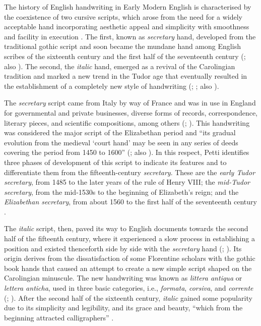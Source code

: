 \documentclass{article}
\begin{document}
The history of English handwriting in Early Modern English is
characterised by the coexistence of two cursive scripts, which arose from the need for a widely acceptable hand incorporating aesthetic
appeal and simplicity with smoothness and facility in execution \citep[16]{petti_english_1977}. The first, known as \emph{secretary} hand, developed from the
traditional gothic script and soon became the mundane hand among English
scribes of the sixteenth century and the first half of the seventeenth
century (\cite[8]{dawson_elizabethan_1966}; also \cite[16]{petti_english_1977}). The
second, the \emph{italic} hand, emerged as a revival of the
Carolingian tradition and marked a new trend in the Tudor age that
eventually resulted in the establishment of a completely new style of
handwriting (\cite[20]{fairbank_renaissance_1960}; \cite[viii]{preston_english_1999}; also \cite[18]{petti_english_1977}).

The \emph{secretary} script came from Italy by way of
France and was in use in England for governmental and private
businesses, diverse forms of records, correspondence, literary pieces,
and scientific compositions, among others (\cite[8--9]{dawson_elizabethan_1966}; \cite[viii]{preston_english_1999}). This handwriting was
considered the major script of the Elizabethan period and ``its gradual
evolution from the medieval `court hand' may be seen in any series of
deeds covering the period from 1450 to 1600'' (\cite[414]{schulz_teaching_1943}; also
\cite{jenkinson_later_1927}). In this respect, Petti identifies three phases of
development of this script to indicate its features and to differentiate
them from the fifteenth-century \emph{secretary}. These are the
\emph{early Tudor secretary}, from 1485 to the later years of the rule
of Henry VIII; the \emph{mid-Tudor secretary}, from the mid-1530s to the
beginning of Elizabeth's reign; and the \emph{Elizabethan secretary},
from about 1560 to the first half of the seventeenth century \citep[16--18]{petti_english_1977}.

The \emph{italic} script, then, paved its way to English
documents towards the second half of the fifteenth century, where it
experienced a slow process in establishing a position and existed
thenceforth side by side with the \emph{secretary} hand (\cite[28]{fairbank_renaissance_1960}; \cite[viii]{preston_english_1999}). Its origin derives from
the dissatisfaction of some Florentine scholars with the gothic book
hands that caused an attempt to create a new simple script shaped on the
Carolingian minuscule. The new handwriting was known as \emph{littera
antiqua} or \emph{lettera anticha}, used in three basic categories, i.e.,
\emph{formata}, \emph{corsiva}, and \emph{corrente} (\cite[6]{morison_early_1943};
\cite[18]{petti_english_1977}). After the second half of the sixteenth century,
\emph{italic} gained some popularity due to its simplicity and
legibility, and its grace and beauty, ``which from the beginning
attracted calligraphers'' \citep[9]{dawson_elizabethan_1966}.
\end{document}
